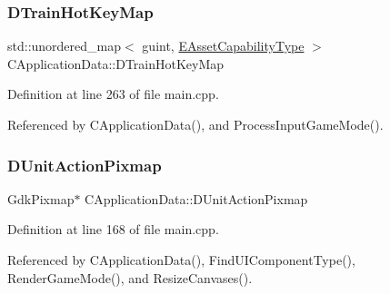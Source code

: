\hypertarget{classCApplicationData_a35798136764b6d2ede555494752e83eb}{}\label{classCApplicationData_a35798136764b6d2ede555494752e83eb} 
\subsubsection{\texorpdfstring{D\+Train\+Hot\+Key\+Map}{DTrainHotKeyMap}}
{\footnotesize\ttfamily std\+::unordered\+\_\+map$<$ guint, \hyperlink{GameDataTypes_8h_a35b98ce26aca678b03c6f9f76e4778ce}{E\+Asset\+Capability\+Type} $>$ C\+Application\+Data\+::\+D\+Train\+Hot\+Key\+Map\hspace{0.3cm}{\ttfamily [protected]}}



Definition at line 263 of file main.\+cpp.



Referenced by C\+Application\+Data(), and Process\+Input\+Game\+Mode().

\hypertarget{classCApplicationData_ae264356c833cd581093e3b373cce6620}{}\label{classCApplicationData_ae264356c833cd581093e3b373cce6620} 
\subsubsection{\texorpdfstring{D\+Unit\+Action\+Pixmap}{DUnitActionPixmap}}
{\footnotesize\ttfamily Gdk\+Pixmap$\ast$ C\+Application\+Data\+::\+D\+Unit\+Action\+Pixmap\hspace{0.3cm}{\ttfamily [protected]}}



Definition at line 168 of file main.\+cpp.



Referenced by C\+Application\+Data(), Find\+U\+I\+Component\+Type(), Render\+Game\+Mode(), and Resize\+Canvases().

\hypertarget{classCApplicationData_a5aca1f832dd6387662f0d4441745cf6f}{}\label{classCApplicationData_a5aca1f832dd6387662f0d4441745cf6f} 
